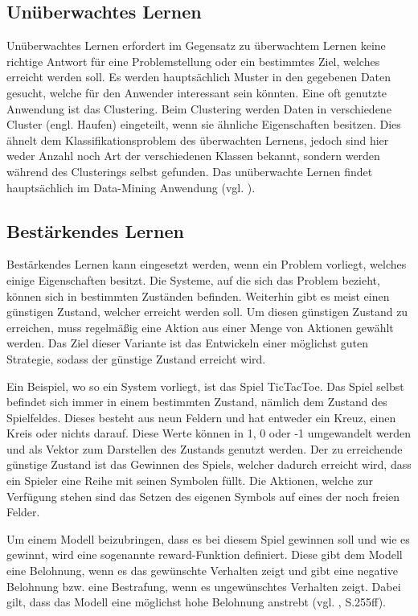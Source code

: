 \subsection{Unüberwachtes Lernen}
\label{subsec:unueberwachtesLernen}
Unüberwachtes Lernen erfordert im Gegensatz zu überwachtem Lernen keine richtige Antwort für eine Problemstellung oder ein bestimmtes Ziel, welches erreicht werden soll. Es werden hauptsächlich Muster in den gegebenen Daten gesucht, welche für den Anwender interessant sein könnten. Eine oft genutzte Anwendung ist das Clustering. Beim Clustering werden Daten in verschiedene Cluster (engl. Haufen) eingeteilt, wenn sie ähnliche Eigenschaften besitzen. Dies ähnelt dem Klassifikationsproblem des überwachten Lernens, jedoch sind hier weder Anzahl noch Art der verschiedenen Klassen bekannt, sondern werden während des Clusterings selbst gefunden. Das unüberwachte Lernen findet hauptsächlich im Data-Mining Anwendung (vgl. \cite[]{ueberwachtMaschLernen}).

\subsection{Bestärkendes Lernen}
\label{subsec:bestaerkendesLernen}
Bestärkendes Lernen kann eingesetzt werden, wenn ein Problem vorliegt, welches einige Eigenschaften besitzt. Die Systeme, auf die sich das Problem bezieht, können sich in bestimmten Zuständen befinden. Weiterhin gibt es meist einen günstigen Zustand, welcher erreicht werden soll. Um diesen günstigen Zustand zu erreichen, muss regelmäßig eine Aktion aus einer Menge von Aktionen gewählt werden. Das Ziel dieser Variante ist das Entwickeln einer möglichst guten Strategie, sodass der günstige Zustand erreicht wird.

Ein Beispiel, wo so ein System vorliegt, ist das Spiel TicTacToe. Das Spiel selbst befindet sich immer in einem bestimmten Zustand, nämlich dem Zustand des Spielfeldes. Dieses besteht aus neun Feldern und hat entweder ein Kreuz, einen Kreis oder nichts darauf. Diese Werte können in 1, 0 oder -1 umgewandelt werden und als Vektor zum Darstellen des Zustands genutzt werden. Der zu erreichende günstige Zustand ist das Gewinnen des Spiels, welcher dadurch erreicht wird, dass ein Spieler eine Reihe mit seinen Symbolen füllt. Die Aktionen, welche zur Verfügung stehen sind das Setzen des eigenen Symbols auf eines der noch freien Felder.

Um einem Modell beizubringen, dass es bei diesem Spiel gewinnen soll und wie es gewinnt, wird eine sogenannte reward-Funktion definiert. Diese gibt dem Modell eine Belohnung, wenn es das gewünschte Verhalten zeigt und gibt eine negative Belohnung bzw. eine Bestrafung, wenn es ungewünschtes Verhalten zeigt. Dabei gilt, dass das Modell eine möglichst hohe Belohnung anstrebt (vgl. \cite[]{StatMaschLernen}, S.255ff).

